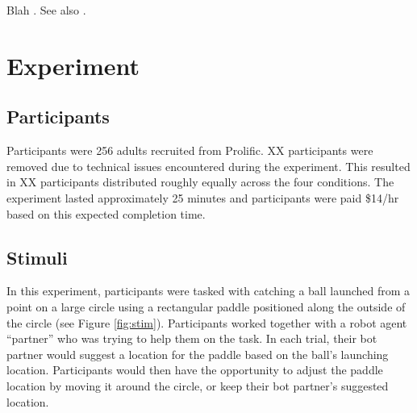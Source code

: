 \documentclass[10pt,letterpaper]{article}
\begin{document}
Blah \cite{gweon2021inferential}.
See also .




\section{Experiment}

\subsection{Participants}

Participants were 256 adults recruited from Prolific. XX participants were removed due to technical issues encountered during the experiment. This resulted in XX participants distributed roughly equally across the four conditions. The experiment lasted approximately 25 minutes and participants were paid \$14/hr based on this expected completion time. 


\subsection{Stimuli}

In this experiment, participants were tasked with catching a ball launched from a point on a large circle using a rectangular paddle positioned along the outside of the circle (see Figure \ref{fig:stim}).\footnotemark{} Participants worked together with a robot agent ``partner'' who was trying to help them on the task. In each trial, their bot partner would suggest a location for the paddle based on the ball's launching location. Participants would then have the opportunity to adjust the paddle location by moving it around the circle, or keep their bot partner's suggested location. 

\end{document}
